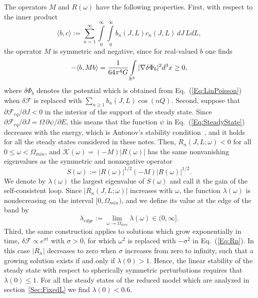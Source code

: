 The operators $M$ and $R(\omega)$ have the following properties. First, with respect to the inner product
\begin{equation}
\langle b,c \rangle := \sum\limits_{n=1}^\infty\int\limits_0^\infty\int\limits_0^\infty b_n(J,L) c_n(J,L)\, dJ\, L dL,
\label{Eq:InnerProduct}
\end{equation}
the operator $M$ is symmetric and negative, since for real-valued $b$ one finds
\begin{equation}
-\langle b,M b \rangle = \frac{1}{64\pi^4 G}\int\limits_{\mathbb{R}^3} |\nabla\delta\Phi_b|^2 d^3 x\geq 0,
\label{Eq:MNegative}
\end{equation}
where $\delta\Phi_b$ denotes the potential which is obtained from Eq.~(\ref{Eq:LinPoisson}) when $\delta\mathcal{F}$ is replaced with $\sum_{n\geq 1} b_n(J,L)\cos(nQ)$. Second, suppose that $\partial\mathcal{F}_{eq}/\partial J < 0$ in the interior of the support of the steady state. Since $\partial\mathcal{F}_{eq}/\partial J = \Omega\,\partial\psi/\partial E$, this means that the function $\psi$ in Eq.~(\ref{Eq:SteadyState}) decreases with the energy, which is Antonov's stability condition~\cite{BinneyTremaine-Book,mHgRmScS25}, and it holds for all the steady states considered in these notes. Then, $R_n(J,L;\omega) < 0$ for all $0\leq \omega < \Omega_{min}$, and $\mathcal{K}(\omega) = (-M)|R(\omega)|$ has the same nonvanishing eigenvalues as the symmetric and nonnegative operator
\begin{equation}
S(\omega) := |R(\omega)|^{1/2} (-M) |R(\omega)|^{1/2}.
\label{Eq:SDef}
\end{equation}
We denote by $\lambda(\omega)$ the largest eigenvalue of $S(\omega)$ and call it the gain of the self-consistent loop. Since $|R_n(J,L;\omega)|$ increases with $\omega$, the function $\lambda(\omega)$ is nondecreasing on the interval $[0,\Omega_{min})$, and we define its value at the edge of the band by
\begin{equation}
\lambda_{edge} := \lim\limits_{\omega\to \Omega_{min}} \lambda(\omega)\in (0,\infty].
\label{Eq:LambdaEdge}
\end{equation}
Third, the same construction applies to solutions which grow exponentially in time, $\delta\mathcal{F}\propto e^{\sigma t}$ with $\sigma > 0$, for which $\omega^2$ is replaced with $-\sigma^2$ in Eq.~(\ref{Eq:Rn}). In this case $|R_n|$ decreases to zero when $\sigma$ increases from zero to infinity, such that a growing solution exists if and only if $\lambda(0) > 1$. Hence, the linear stability of the steady state with respect to spherically symmetric perturbations requires that $\lambda(0)\leq 1$. For all the steady states of the reduced model which are analyzed in section~\ref{Sec:FixedL} we find $\lambda(0) < 0.6$.

